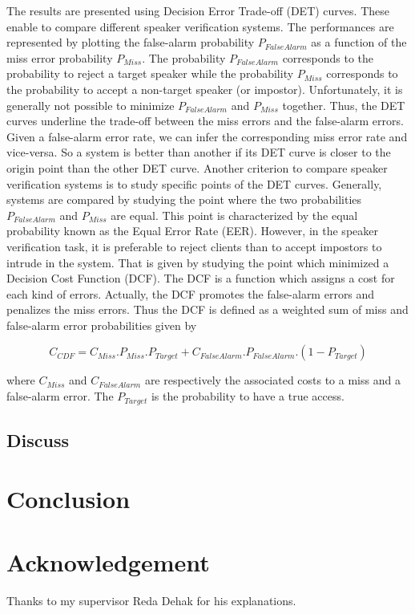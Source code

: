 \documentclass{techrep}
\begin{document}
The results are presented using Decision Error Trade-off (DET)
curves. These enable to compare different speaker verification
systems. The performances are represented by plotting the false-alarm
probability $P_{FalseAlarm}$ as a function of the miss error
probability $P_{Miss}$. The probability $P_{FalseAlarm}$ corresponds
to the probability to reject a target speaker while the probability
$P_{Miss}$ corresponds to the probability to accept a non-target
speaker (or impostor). Unfortunately, it is generally not possible to
minimize $P_{FalseAlarm}$ and $P_{Miss}$ together. Thus, the DET
curves underline the trade-off between the miss errors and the
false-alarm errors. Given a false-alarm error rate, we can infer the
corresponding miss error rate and vice-versa. So a system is better
than another if its DET curve is closer to the origin point than the
other DET curve.  Another criterion to compare speaker verification
systems is to study specific points of the DET curves. Generally,
systems are compared by studying the point where the two probabilities
$P_{FalseAlarm}$ and $P_{Miss}$ are equal. This point is characterized
by the equal probability known as the Equal Error Rate (EER). However,
in the speaker verification task, it is preferable to reject
clients than to accept impostors to intrude in the system. That is
given by studying the point which minimized a Decision Cost Function
(DCF). The DCF is a function which assigns a cost for each kind of
errors. Actually, the DCF promotes the false-alarm errors and
penalizes the miss errors. Thus the DCF is defined as a weighted sum
of miss and false-alarm error probabilities given by

$$C_{CDF} = C_{Miss}.P_{Miss}.P_{Target} + C_{FalseAlarm}.P_{FalseAlarm}.(1 - P_{Target})$$

where $C_{Miss}$ and $C_{FalseAlarm}$ are respectively the associated
costs to a miss and a false-alarm error. The $P_{Target}$ is the
probability to have a true access.

\section{Discuss}

\chapter*{Conclusion}

\chapter*{Acknowledgement}
Thanks to my supervisor Reda Dehak for his explanations.

 \nocite{*}
\end{document}

